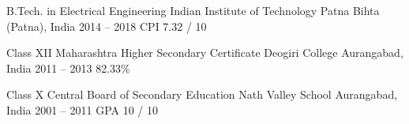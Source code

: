 
\begin{cveducation}

\cvschool
	{B.Tech. in Electrical Engineering} %
	{Indian Institute of Technology Patna} %
	{Bihta (Patna), India} %
	{2014 -- 2018} %
	{CPI 7.32 / 10} %

\cvschool
	{Class XII Maharashtra Higher Secondary Certificate} %
	{Deogiri College} %
	{Aurangabad, India} %
	{2011 -- 2013} %
	{82.33\%} %

\cvschool
	{Class X Central Board of Secondary Education} %
	{Nath Valley School} %
	{Aurangabad, India} %
	{2001 -- 2011} %
	{GPA 10 / 10} %

\end{cveducation}
